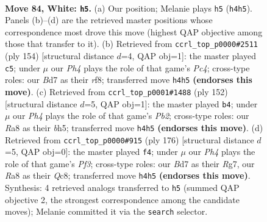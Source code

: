 \documentclass[11pt]{article}
\begin{document}
\clearpage

\begin{figure}[p]\centering
\begin{subfigure}{0.46\textwidth}\centering
\resizebox{\linewidth}{!}{%
\newchessgame
\chessboard[
  setfen={R7/3B1P2/8/8/1k5P/8/8/7K w - - 11 84},
  showmover=false,
  pgfstyle=straightmove, color=movearrow, markmove={h4-h5}
]}
\caption{}
\end{subfigure}\hfill
\begin{subfigure}{0.46\textwidth}\centering
\resizebox{\linewidth}{!}{%
\newchessgame
\chessboard[
  setfen={5r2/k7/6R1/p7/2P5/8/1K6/8 w - - 3 78},
  showmover=false,
  pgfstyle=straightmove, color=movearrow, markmove={c4-c5}
]}
\caption{}
\end{subfigure}
\\[4pt]
\begin{subfigure}{0.46\textwidth}\centering
\resizebox{\linewidth}{!}{%
\newchessgame
\chessboard[
  setfen={8/8/5p2/3k3b/8/8/1P1K4/6B1 w - - 8 77},
  showmover=false,
  pgfstyle=straightmove, color=movearrow, markmove={b2-b4}
]}
\caption{}
\end{subfigure}\hfill
\begin{subfigure}{0.46\textwidth}\centering
\resizebox{\linewidth}{!}{%
\newchessgame
\chessboard[
  setfen={2Q5/6R1/8/k7/8/3K1P2/8/8 w - - 1 89},
  showmover=false,
  pgfstyle=straightmove, color=movearrow, markmove={f3-f4}
]}
\caption{}
\end{subfigure}
\caption{\textbf{Move 84, White: \texttt{h5}.} (a) Our position; Melanie plays \texttt{h5} (\texttt{h4h5}). Panels (b)--(d) are the retrieved master positions whose correspondence most drove this move (highest QAP objective among those that transfer to it). (b) Retrieved from \texttt{ccrl\_top\_p0000\#2511} (ply 154) [structural distance $d$=4, QAP obj=1]: the master played \texttt{c5}; under $\mu$ our \emph{Ph4} plays the role of that game's \emph{Pc4}; cross-type roles: our \emph{B}d7 as their \emph{r}f8; transferred move \texttt{h4h5} \textbf{(endorses this move)}. (c) Retrieved from \texttt{ccrl\_top\_p0001\#1488} (ply 152) [structural distance $d$=5, QAP obj=1]: the master played \texttt{b4}; under $\mu$ our \emph{Ph4} plays the role of that game's \emph{Pb2}; cross-type roles: our \emph{R}a8 as their \emph{b}h5; transferred move \texttt{h4h5} \textbf{(endorses this move)}. (d) Retrieved from \texttt{ccrl\_top\_p0000\#915} (ply 176) [structural distance $d$=5, QAP obj=0]: the master played \texttt{f4}; under $\mu$ our \emph{Ph4} plays the role of that game's \emph{Pf3}; cross-type roles: our \emph{B}d7 as their \emph{R}g7, our \emph{R}a8 as their \emph{Q}c8; transferred move \texttt{h4h5} \textbf{(endorses this move)}. Synthesis: 4 retrieved analogs transferred to \texttt{h5} (summed QAP objective 2, the strongest correspondence among the candidate moves); Melanie committed it via the \texttt{search} selector.}
\label{fig:thought-m166}
\end{figure}
\end{document}
